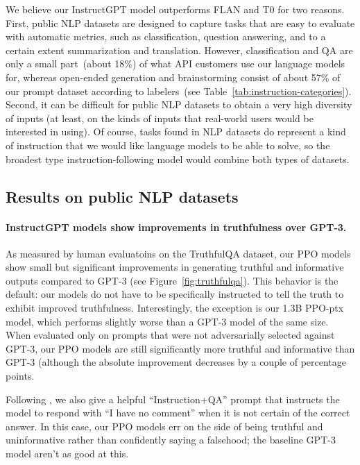 We believe our InstructGPT model outperforms FLAN and T0 for two reasons. First, public NLP datasets are designed to capture tasks that are easy to evaluate with automatic metrics, such as classification, question answering, and to a certain extent summarization and translation. However, classification and QA are only a small part~(about 18\%) of what API customers use our language models for, whereas open-ended generation and brainstorming consist of about 57\% of our prompt dataset according to labelers~(see Table~\ref{tab:instruction-categories}). Second, it can be difficult for public NLP datasets to obtain a very high diversity of inputs (at least, on the kinds of inputs that real-world users would be interested in using). Of course, tasks found in NLP datasets do represent a kind of instruction that we would like language models to be able to solve, so the broadest type instruction-following model would combine both types of datasets.

\subsection{Results on public NLP datasets}
\label{sec:results-public-nlp}

\paragraph{InstructGPT models show improvements in truthfulness over GPT-3.} As measured by human evaluatoins on the TruthfulQA dataset, our PPO models show small but significant improvements in generating truthful and informative outputs compared to GPT-3 (see Figure~\ref{fig:truthfulqa}). This behavior is the default: our models do not have to be specifically instructed to tell the truth to exhibit improved truthfulness. Interestingly, the exception is our 1.3B PPO-ptx model, which performs slightly worse than a GPT-3 model of the same size. When evaluated only on prompts that were not adversarially selected against GPT-3, our PPO models are still significantly more truthful and informative than GPT-3 (although the absolute improvement decreases by a couple of percentage points. 

Following \citet{lin2021truthfulqa}, we also give a helpful ``Instruction+QA'' prompt that instructs the model to respond with ``I have no comment'' when it is not certain of the correct answer. In this case, our PPO models err on the side of being truthful and uninformative rather than confidently saying a falsehood; the baseline GPT-3 model aren't as good at this. 

